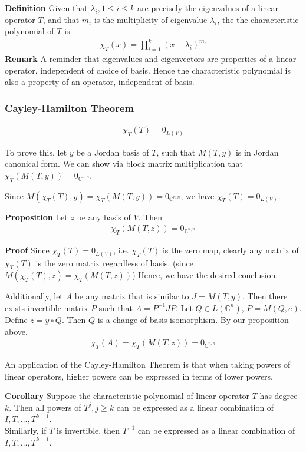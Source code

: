 \documentclass{article}
\begin{document}
\textbf{Definition} Given that $\lambda_i, 1\leq i\leq k$ are precisely the eigenvalues of a linear operator $T$, and that $m_i$ is the multiplicity of eigenvalue $\lambda_i$, the the characteristic polynomial of $T$ is 
\begin{align*}
	\chi_T(x)=\prod_{i=1}^k (x-\lambda_i)^{m_i}
\end{align*}
\textbf{Remark} A reminder that eigenvalues and eigenvectors are properties of a linear operator, independent of choice of basis. Hence the characteristic polynomial is also a property of an operator, independent of basis.


\subsubsection{Cayley-Hamilton Theorem}
\begin{align*}
	\chi_T(T)=0_{L(V)}
\end{align*}

To prove this, let $y$ be a Jordan basis of $T$, such that $M(T, y)$ is in Jordan canonical form. We can show via block matrix multiplication that $\chi_T(M(T,y))=0_{\mathbb{C}^{n,n}}$.

Since $M(\chi_T(T), y) = \chi_T(M(T, y)) = 0_{\mathbb{C}^{n,n}}$, we have $\chi_T(T)=0_{L(V)}$.

\textbf{Proposition} Let $z$ be any basis of $V$. Then 
\begin{align*}
	\chi_T(M(T,z))=0_{\mathbb{C}^{n,n}}
\end{align*}

\textbf{Proof} Since $\chi_T(T)=0_{L(V)}$, i.e. $\chi_T(T)$ is the zero map, clearly any matrix of $\chi_T(T)$ is the zero matrix regardless of basis. (since $M(\chi_T(T), z) = \chi_T(M(T, z))$) Hence, we have the desired conclusion.

Additionally, let $A$ be any matrix that is similar to $J=M(T, y)$. Then there exists invertible matrix $P$ such that $A=P^{-1}JP$. Let $Q\in L(\mathbb{C}^n)$, $P=M(Q, e)$. Define $z=y\circ Q$. Then $Q$ is a change of basis isomorphism. By our proposition above,
\begin{align*}
	\chi_T(A) = \chi_T(M(T,z)) = 0_{\mathbb{C}^{n,n}}
\end{align*}

An application of the Cayley-Hamilton Theorem is that when taking powers of linear operators, higher powers can be expressed in terms of lower powers.

\textbf{Corollary} Suppose the characteristic polynomial of linear operator $T$ has degree $k$. Then all powers of $T^j, j\geq k$ can be expressed as a linear combination of $I, T, \dots, T^{k-1}$.\\
Similarly, if $T$ is invertible, then $T^{-1}$ can be expressed as a linear combination of $I, T, \dots, T^{k-1}$.
\end{document}
